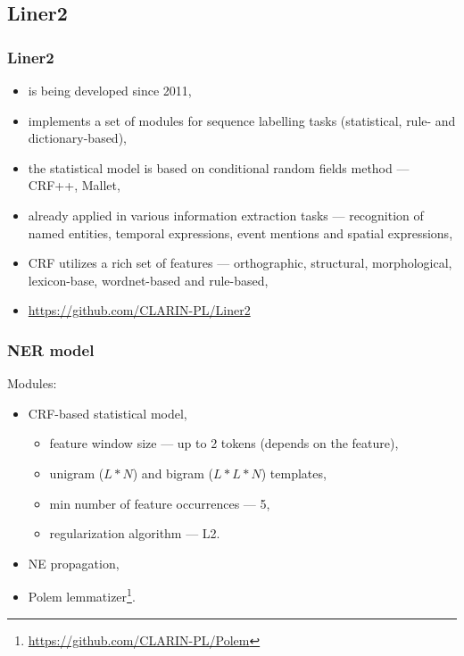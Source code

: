 \documentclass[Warsaw]{beamer}
\begin{document}
\subsection{Liner2}

\begin{frame}
    \frametitle{Liner2}
    \begin{itemize}
        \item is being developed since 2011,
        \item implements a set of modules for sequence labelling tasks (statistical, rule- and dictionary-based),
        \item the statistical model is based on conditional random fields method --- CRF++, Mallet,
        \item already applied in various information extraction tasks --- recognition of named entities, temporal expressions, event mentions and spatial expressions, 
        \item CRF utilizes a rich set of features --- orthographic, structural, morphological, lexicon-base, wordnet-based and rule-based,
        \item \url{https://github.com/CLARIN-PL/Liner2}
    \end{itemize}
\end{frame}

\begin{frame}
    \frametitle{NER model}
    Modules:
    \begin{itemize}
        \item CRF-based statistical model,
            \begin{itemize}
                \item feature window size --- up to 2 tokens (depends on the feature),
                \item unigram ($L*N$) and bigram ($L*L*N$) templates,
                \item min number of feature occurrences --- 5,
                \item regularization algorithm --- L2.
            \end{itemize}
        \item NE propagation,
        \item Polem lemmatizer\footnote{\url{https://github.com/CLARIN-PL/Polem}}.
    \end{itemize}
\end{frame}
\end{document}
